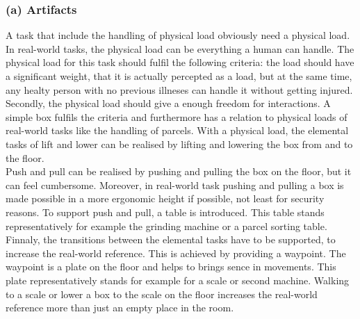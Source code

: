 \subsubsection{(a) Artifacts}
A task that include the handling of physical load obviously need a physical load. In real-world tasks, the physical load can be everything a human can handle. The physical load for this task should fulfil the following criteria: the load should have a significant weight, that it is actually percepted as a load, but at the same time, any healty person with no previous illneses can handle it without getting injured. Secondly, the physical load should give a enough freedom for interactions. A simple box fulfils the criteria and furthermore has a relation to physical loads of real-world tasks like the handling of parcels. With a physical load, the elemental tasks of lift and lower can be realised by lifting and lowering the box from and to the floor.\\
Push and pull can be realised by pushing and pulling the box on the floor, but it can feel cumbersome. Moreover, in real-world task pushing and pulling a box is made possible in a more ergonomic height if possible, not least for security reasons. To support push and pull, a table is introduced. This table stands representatively for example the grinding machine or a parcel sorting table.\\
Finnaly, the transitions between the elemental tasks have to be supported, to increase the real-world reference. This is achieved by providing a waypoint. The waypoint is a plate on the floor and helps to brings sence in movements. This plate representatively stands for example for a scale or second machine. Walking to a scale or lower a box to the scale on the floor increases the real-world reference more than just an empty place in the room.

